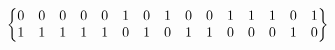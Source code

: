 \[  \setcounter{MaxMatrixCols}{15}
\begin{Bmatrix}
0 & 0 & 0 & 0 & 0 & 1 & 0 & 1 & 0 & 0 & 1 & 1 & 1 & 0 & 1\\
1 & 1 & 1 & 1 & 1 & 0 & 1 & 0 & 1 & 1 & 0 & 0 & 0 & 1 & 0
\end{Bmatrix}  \]

